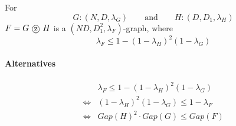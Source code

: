 \begin{theorem}
	\label{thm:rozenmann vadhan 05 rvw 01}
	For 
	\begin{equation}
		G: (N, D, \lambda_G) \quad \quad 
		\text{and} \quad \quad H : (D, D_1, \lambda_H)
	\end{equation}
	$F = G \tcircle {z} H$ is a $(ND, D_1^2, \lambda_F)$-graph, where 
	\begin{equation}
		\lambda_F \leq 1 - (1 - \lambda_H) ^2 (1 - \lambda_G) 
	\end{equation}
	
	\paragraph{Alternatives} 
	\begin{align}
		& \lambda_F \leq 1 - (1 - \lambda_H) ^2 (1 - \lambda_G) \\
		\iff & (1 - \lambda_H)^2 (1 - \lambda_G) \leq 1 - \lambda_F \\
		\iff & Gap(H)^2 \cdot Gap(G) \leq Gap(F)
	\end{align}
\end{theorem}

